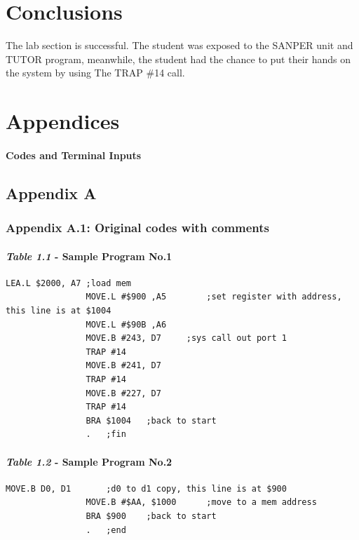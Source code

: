 \documentclass{article}
\begin{document}

\section{Conclusions}
The lab section is successful. The student was exposed to the SANPER unit and TUTOR program, meanwhile, the student had the chance to put their hands on the system by using The TRAP \#14 call.





\section{Appendices}
\paragraph{Codes and Terminal Inputs}

	\subsection{Appendix A}
		\subsubsection{Appendix A.1: Original codes with comments}
			\paragraph{\textit{Table 1.1} - Sample Program No.1}
				\begin{verbatim}LEA.L $2000, A7	;load mem
				MOVE.L #$900 ,A5		;set register with address, this line is at $1004
				MOVE.L #$90B ,A6
				MOVE.B #243, D7		;sys call out port 1
				TRAP #14
				MOVE.B #241, D7
				TRAP #14
				MOVE.B #227, D7
				TRAP #14
				BRA $1004	;back to start
				.	;fin
				\end{verbatim}
			\paragraph{\textit{Table 1.2} - Sample Program No.2}
				\begin{verbatim}MOVE.B D0, D1		;d0 to d1 copy, this line is at $900
				MOVE.B #$AA, $1000		;move to a mem address
				BRA $900	;back to start
				.	;end
				\end{verbatim}
\end{document}
